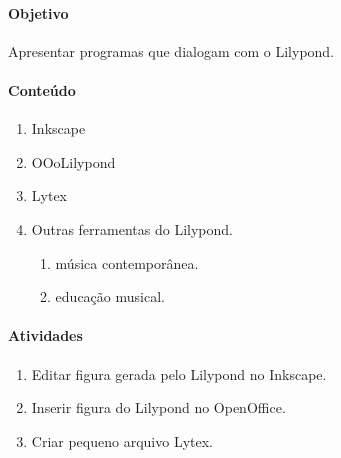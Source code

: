 \documentclass[12pt,brazil]{article}
\begin{document}
\paragraph{Objetivo}
Apresentar programas que dialogam com o Lilypond.
\paragraph{Conteúdo}
\begin{enumerate}
\item Inkscape
\item OOoLilypond
\item Lytex
\item Outras ferramentas do Lilypond.
  \begin{enumerate}
  \item música contemporânea.
  \item educação musical.
  \end{enumerate}
\end{enumerate}
\paragraph{Atividades}
\begin{enumerate}
\item Editar figura gerada pelo Lilypond no Inkscape.
\item Inserir figura do Lilypond no OpenOffice.
\item Criar pequeno arquivo Lytex.
\end{enumerate}
\end{document}
